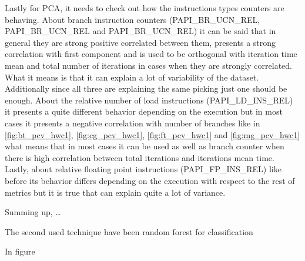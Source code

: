 Lastly for PCA, it needs to check out how the instructions types counters are
behaving. About branch instruction counters (PAPI\_BR\_UCN\_REL,
PAPI\_BR\_UCN\_REL and PAPI\_BR\_UCN\_REL) it can be said that in general they
are strong positive correlated between them, presents a strong
correlation with first component and is used to be orthogonal with iteration
time mean and total number of iterations in cases when they are strongly
correlated. What it means is that it can explain a lot of variability of the 
dataset. Additionally since all three are explaining the same picking just one
should be enough. About the relative number of load instructions 
(PAPI\_LD\_INS\_REL) it presents a quite different behavior depending on the
execution but in most cases it presents a negative correlation with number of
branches like in \ref{fig:bt_pcv_hwc1}, \ref{fig:cg_pcv_hwc1},
\ref{fig:ft_pcv_hwc1} and \ref{fig:mg_pcv_hwc1} what means that in most cases it
can be used as well as branch counter when there is high correlation between
total iterations and iterations mean time. Lastly, about relative floating
point instructions (PAPI\_FP\_INS\_REL) like before its behavior differs
depending on the execution with respect to the rest of metrics but it is true 
that can explain quite a lot of variance.

Summing up, \ldots


The second used technique have been random forest for classification

In figure 

